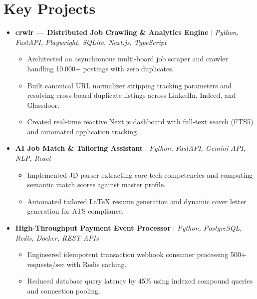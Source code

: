 \documentclass[letterpaper,10pt]{article}
\begin{document}
\section{Key Projects}
\begin{itemize}[leftmargin=0.15in, label={}]
  \item
    \textbf{crwlr — Distributed Job Crawling \& Analytics Engine} $|$ \textit{Python, FastAPI, Playwright, SQLite, Next.js, TypeScript}\vspace{-4pt}
    \begin{itemize}
      \item \small{Architected an asynchronous multi-board job scraper and crawler handling 10,000+ postings with zero duplicates.}\n      \item \small{Built canonical URL normalizer stripping tracking parameters and resolving cross-board duplicate listings across LinkedIn, Indeed, and Glassdoor.}\n      \item \small{Created real-time reactive Next.js dashboard with full-text search (FTS5) and automated application tracking.}\n    \end{itemize}
  \item
    \textbf{AI Job Match \& Tailoring Assistant} $|$ \textit{Python, FastAPI, Gemini API, NLP, React}\vspace{-4pt}
    \begin{itemize}
      \item \small{Implemented JD parser extracting core tech competencies and computing semantic match scores against master profile.}\n      \item \small{Automated tailored LaTeX resume generation and dynamic cover letter generation for ATS compliance.}\n    \end{itemize}
  \item
    \textbf{High-Throughput Payment Event Processor} $|$ \textit{Python, PostgreSQL, Redis, Docker, REST APIs}\vspace{-4pt}
    \begin{itemize}
      \item \small{Engineered idempotent transaction webhook consumer processing 500+ requests/sec with Redis caching.}\n      \item \small{Reduced database query latency by 45\% using indexed compound queries and connection pooling.}\n    \end{itemize}
\end{itemize}

\end{document}
